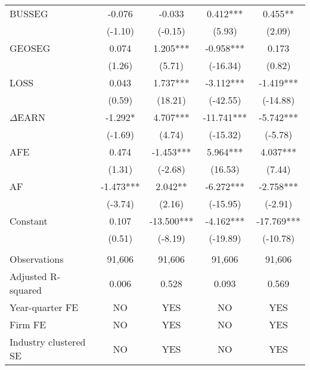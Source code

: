\begin{table}[htbp]
\begin{tabular}{lcccc}
    BUSSEG & -0.076 & -0.033 & 0.412*** & 0.455** \\
      & (-1.10) & (-0.15) & (5.93) & (2.09) \\
    GEOSEG & 0.074 & 1.205*** & -0.958*** & 0.173 \\
      & (1.26) & (5.71) & (-16.34) & (0.82) \\
    LOSS & 0.043 & 1.737*** & -3.112*** & -1.419*** \\
      & (0.59) & (18.21) & (-42.55) & (-14.88) \\
    $\Delta$EARN & -1.292* & 4.707*** & -11.741*** & -5.742*** \\
      & (-1.69) & (4.74) & (-15.32) & (-5.78) \\
    AFE & 0.474 & -1.453*** & 5.964*** & 4.037*** \\
      & (1.31) & (-2.68) & (16.53) & (7.44) \\
    AF & -1.473*** & 2.042** & -6.272*** & -2.758*** \\
      & (-3.74) & (2.16) & (-15.95) & (-2.91) \\
    Constant & 0.107 & -13.500*** & -4.162*** & -17.769*** \\
      & (0.51) & (-8.19) & (-19.89) & (-10.78) \\
      &   &   &   &  \\
    Observations & 91,606 & 91,606 & 91,606 & 91,606 \\
    Adjusted R-squared & 0.006 & 0.528 & 0.093 & 0.569 \\
    Year-quarter FE & NO & YES & NO & YES \\
    Firm FE & NO & YES & NO & YES \\
    Industry clustered SE & NO & YES & NO & YES \\
    \bottomrule
    \bottomrule
    \end{tabular}%
\end{table}%
